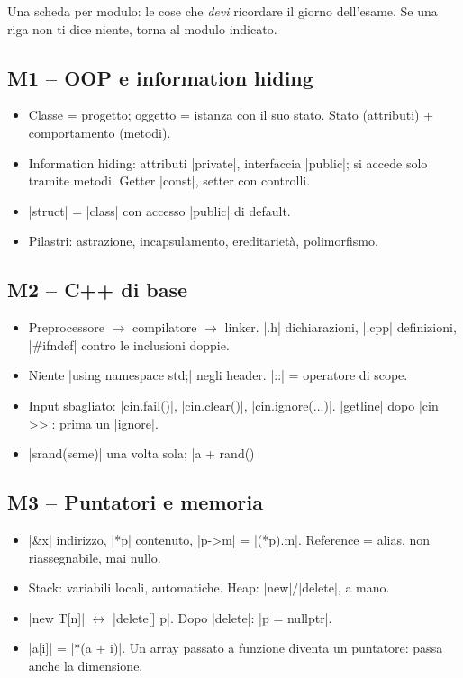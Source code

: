 Una scheda per modulo: le cose che \emph{devi} ricordare il giorno dell'esame. Se una riga
non ti dice niente, torna al modulo indicato.

\subsection*{M1 -- OOP e information hiding}
\begin{itemize}
  \item Classe = progetto; oggetto = istanza con il suo stato. Stato (attributi) +
        comportamento (metodi).
  \item Information hiding: attributi \cc|private|, interfaccia \cc|public|; si accede solo
        tramite metodi. Getter \cc|const|, setter con controlli.
  \item \cc|struct| = \cc|class| con accesso \cc|public| di default.
  \item Pilastri: astrazione, incapsulamento, ereditarietà, polimorfismo.
\end{itemize}

\subsection*{M2 -- C++ di base}
\begin{itemize}
  \item Preprocessore $\to$ compilatore $\to$ linker. \cc|.h| dichiarazioni, \cc|.cpp|
        definizioni, \cc|#ifndef| contro le inclusioni doppie.
  \item Niente \cc|using namespace std;| negli header. \cc|::| = operatore di scope.
  \item Input sbagliato: \cc|cin.fail()|, \cc|cin.clear()|, \cc|cin.ignore(...)|.
        \cc|getline| dopo \cc|cin >>|: prima un \cc|ignore|.
  \item \cc|srand(seme)| una volta sola; \cc|a + rand() %
\end{itemize}

\subsection*{M3 -- Puntatori e memoria}
\begin{itemize}
  \item \cc|&x| indirizzo, \cc|*p| contenuto, \cc|p->m| = \cc|(*p).m|. Reference = alias,
        non riassegnabile, mai nullo.
  \item Stack: variabili locali, automatiche. Heap: \cc|new|/\cc|delete|, a mano.
  \item \cc|new T[n]| $\leftrightarrow$ \cc|delete[] p|. Dopo \cc|delete|: \cc|p = nullptr|.
  \item \cc|a[i]| = \cc|*(a + i)|. Un array passato a funzione diventa un puntatore: passa
        anche la dimensione.
\end{itemize}

